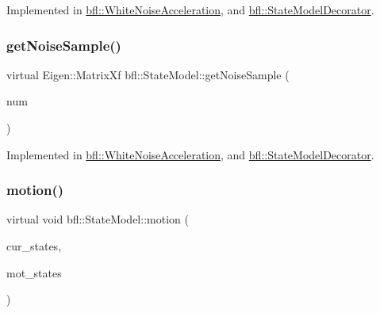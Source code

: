 Implemented in \mbox{\hyperlink{classbfl_1_1WhiteNoiseAcceleration_a09c79104b153e6fb610bb2f1c6405636}{bfl\+::\+White\+Noise\+Acceleration}}, and \mbox{\hyperlink{classbfl_1_1StateModelDecorator_a1c64652f48c9463a2fa9b9e85d5ef0cf}{bfl\+::\+State\+Model\+Decorator}}.

\mbox{\label{classbfl_1_1StateModel_ab1f0aa4c804b7de86c68294de3df76ee}} 
\subsubsection{\texorpdfstring{get\+Noise\+Sample()}{getNoiseSample()}}
{\footnotesize\ttfamily virtual Eigen\+::\+Matrix\+Xf bfl\+::\+State\+Model\+::get\+Noise\+Sample (\begin{DoxyParamCaption}\item[{const int}]{num }\end{DoxyParamCaption})\hspace{0.3cm}{\ttfamily [pure virtual]}}



Implemented in \mbox{\hyperlink{classbfl_1_1WhiteNoiseAcceleration_ac4bf4116d3a88435b9d070cbc8736656}{bfl\+::\+White\+Noise\+Acceleration}}, and \mbox{\hyperlink{classbfl_1_1StateModelDecorator_a3e29bad844203ffc3fe0c2bc445377e5}{bfl\+::\+State\+Model\+Decorator}}.

\mbox{\label{classbfl_1_1StateModel_a3601485697ae3445ec7ca753dbeb035c}} 
\subsubsection{\texorpdfstring{motion()}{motion()}}
{\footnotesize\ttfamily virtual void bfl\+::\+State\+Model\+::motion (\begin{DoxyParamCaption}\item[{const Eigen\+::\+Ref$<$ const Eigen\+::\+Matrix\+Xf $>$ \&}]{cur\+\_\+states,  }\item[{Eigen\+::\+Ref$<$ Eigen\+::\+Matrix\+Xf $>$}]{mot\+\_\+states }\end{DoxyParamCaption})\hspace{0.3cm}{\ttfamily [pure virtual]}}



